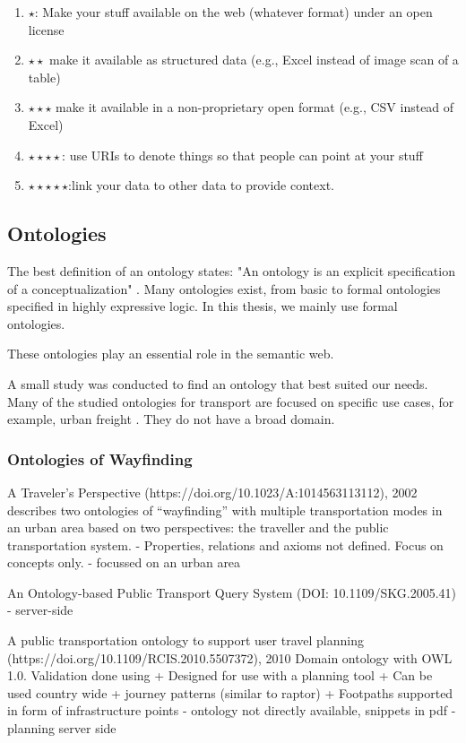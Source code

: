 \begin{enumerate}
    \item $\star$: Make your stuff available on the web (whatever format) under an open license
    \item $\star\star$ make it available as structured data (e.g., Excel instead of image scan of a table)
    \item $\star\star\star$ make it available in a non-proprietary open format (e.g., CSV instead of Excel)
    \item $\star\star\star\star$: use URIs to denote things so that people can point at your stuff
    \item $\star\star\star\star\star$:link your data to other data to provide context.
\end{enumerate}

\subsection{Ontologies}
The best definition of an ontology states: "An ontology is an explicit specification of a conceptualization" \cite{gruber_translation_1993}. Many ontologies exist, from basic to formal ontologies specified in highly expressive logic. In this thesis, we mainly use formal ontologies.

These ontologies play an essential role in the semantic web. 

A small study was conducted to find an ontology that best suited our needs. Many of the studied ontologies for transport are focused on specific use cases, for example, urban freight \cite{bouhana_ontology-based_2015}. They do not have a broad domain. 

\subsubsection{Ontologies of Wayfinding}
A Traveler’s Perspective (https://doi.org/10.1023/A:1014563113112), 2002
describes two ontologies of “wayfinding” with multiple transportation modes in an urban area based on two perspectives: the traveller and the public transportation system.
- Properties, relations and axioms not defined. Focus on concepts only.
- focussed on an urban area

An Ontology-based Public Transport Query System (DOI: 10.1109/SKG.2005.41)
- server-side 

 A public transportation ontology to support user travel planning (https://doi.org/10.1109/RCIS.2010.5507372), 2010
Domain ontology with OWL 1.0. Validation done using 
+ Designed for use with a planning tool
+ Can be used country wide
+ journey patterns (similar to raptor)
+ Footpaths supported in form of infrastructure points
- ontology not directly available, snippets in pdf
- planning server side

